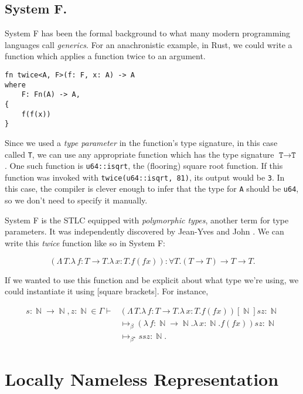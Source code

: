 \documentclass[logo,bsc,singlespacing,parskip,online]{infthesis}
\DeclareMathOperator{\nat}{\mathbb{N}}
\begin{document}
\subsection{System F.}
System F has been the formal background to what many modern programming
languages call \textit{generics}. For an anachronistic example, in Rust, we could write a function
which applies a function twice to an argument.

\begin{verbatim}
fn twice<A, F>(f: F, x: A) -> A
where
    F: Fn(A) -> A,
{
    f(f(x))
}
\end{verbatim}

Since we used a \textit{type parameter} in the function's type signature, in this case called
\texttt{T}, we can use any appropriate function which has the type signature $\texttt{T} \to
\texttt{T}$. One such function is \texttt{u64::isqrt}, the (flooring) square root function. If this
function was invoked with \texttt{twice(u64::isqrt, 81)}, its output would be \texttt{3}. In this
case, the compiler is clever enough to infer that the type for \texttt{A} should be \texttt{u64}, so
we don't need to specify it manually.

System F is the STLC equipped with \textit{polymorphic types}, another term for type parameters. It
was independently discovered by Jean-Yves \citet{girard_interpretation_1972} and John
\citet{goos_towards_1974}. We can write this \textit{twice} function like so in System F:

\begin{equation*}
  (\Lambda \, T. \lambda \, f \colon T \to T . \lambda \, x \colon T . f (f x))
  \colon \forall T . (T \to T) \to T \to T.
\end{equation*}

If we wanted to use this function and be explicit about what type we're using, we could instantiate
it using [square brackets]. For instance,

\begin{align*}
  s \colon \nat \to \nat, z \colon \nat \in \Gamma \vdash
  &(\Lambda \, T. \lambda \, f \colon T \to T . \lambda \, x \colon T . f (f x))[\nat] s z \colon \nat\\
  &\mapsto_{\beta} (\lambda \, f \colon \nat \to \nat . \lambda \, x \colon \nat . f (f x)) s z \colon \nat\\
  &\mapsto_{\beta^{\star}} s s z \colon \nat.
\end{align*}

\section{Locally Nameless Representation}
\end{document}
